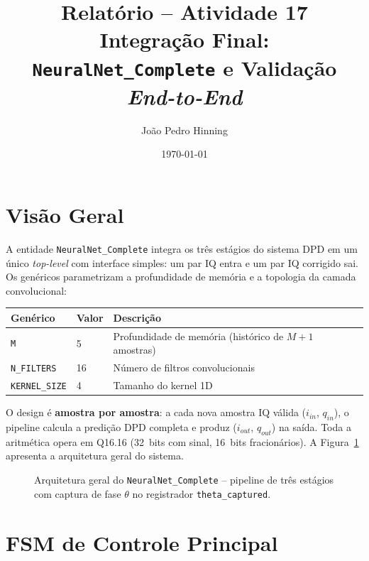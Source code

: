 \documentclass[a4paper,12pt]{article}
\title{Relat\'orio -- Atividade 17 \\
       \large Integra\c{c}\~ao Final: \texttt{NeuralNet\_Complete} e Valida\c{c}\~ao \textit{End-to-End}}
\author{Jo\~ao Pedro Hinning}
\date{\today}
\begin{document}
\maketitle
\thispagestyle{fancy}

\section{Vis\~ao Geral}

A entidade \texttt{NeuralNet\_Complete} integra os tr\^es est\'agios do sistema DPD em um \'unico \textit{top-level} com interface simples: um par IQ entra e um par IQ corrigido sai. Os gen\'ericos parametrizam a profundidade de mem\'oria e a topologia da camada convolucional:

\begin{center}
\small
\begin{tabular}{lll}
\hline
\textbf{Gen\'erico} & \textbf{Valor} & \textbf{Descri\c{c}\~ao} \\
\hline
\texttt{M}           & 5  & Profundidade de mem\'oria (hist\'orico de $M+1$ amostras) \\
\texttt{N\_FILTERS}  & 16 & N\'umero de filtros convolucionais \\
\texttt{KERNEL\_SIZE}& 4  & Tamanho do kernel 1D \\
\hline
\end{tabular}
\end{center}

O design \'e \textbf{amostra por amostra}: a cada nova amostra IQ v\'alida ($i_{in}$, $q_{in}$), o pipeline calcula a predi\c{c}\~ao DPD completa e produz ($i_{out}$, $q_{out}$) na sa\'ida. Toda a aritm\'etica opera em Q16.16 (32~bits com sinal, 16~bits fracion\'arios). A Figura~\ref{fig:sistema_completo} apresenta a arquitetura geral do sistema.

\begin{figure}[H]
\centering
\resizebox{\textwidth}{!}{%
%
}
\caption{Arquitetura geral do \texttt{NeuralNet\_Complete} -- pipeline de tr\^es est\'agios com captura de fase $\theta$ no registrador \texttt{theta\_captured}.}
\label{fig:sistema_completo}
\end{figure}


\section{FSM de Controle Principal}
\end{document}
